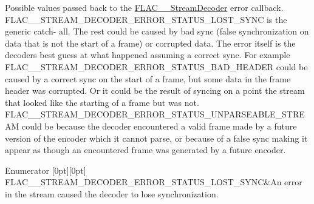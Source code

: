 Possible values passed back to the \hyperlink{struct_f_l_a_c_____stream_decoder}{F\+L\+A\+C\+\_\+\+\_\+\+Stream\+Decoder} error callback. {\ttfamily F\+L\+A\+C\+\_\+\+\_\+\+S\+T\+R\+E\+A\+M\+\_\+\+D\+E\+C\+O\+D\+E\+R\+\_\+\+E\+R\+R\+O\+R\+\_\+\+S\+T\+A\+T\+U\+S\+\_\+\+L\+O\+S\+T\+\_\+\+S\+Y\+NC} is the generic catch-\/ all. The rest could be caused by bad sync (false synchronization on data that is not the start of a frame) or corrupted data. The error itself is the decoder\textquotesingle{}s best guess at what happened assuming a correct sync. For example {\ttfamily F\+L\+A\+C\+\_\+\+\_\+\+S\+T\+R\+E\+A\+M\+\_\+\+D\+E\+C\+O\+D\+E\+R\+\_\+\+E\+R\+R\+O\+R\+\_\+\+S\+T\+A\+T\+U\+S\+\_\+\+B\+A\+D\+\_\+\+H\+E\+A\+D\+ER} could be caused by a correct sync on the start of a frame, but some data in the frame header was corrupted. Or it could be the result of syncing on a point the stream that looked like the starting of a frame but was not. {\ttfamily F\+L\+A\+C\+\_\+\+\_\+\+S\+T\+R\+E\+A\+M\+\_\+\+D\+E\+C\+O\+D\+E\+R\+\_\+\+E\+R\+R\+O\+R\+\_\+\+S\+T\+A\+T\+U\+S\+\_\+\+U\+N\+P\+A\+R\+S\+E\+A\+B\+L\+E\+\_\+\+S\+T\+R\+E\+AM} could be because the decoder encountered a valid frame made by a future version of the encoder which it cannot parse, or because of a false sync making it appear as though an encountered frame was generated by a future encoder. \begin{DoxyEnumFields}{Enumerator}
[0pt][0pt]{}\mbox{\label{group__flac__stream__decoder_gga130e70bd9a73d3c2416247a3e5132ecfa3ceec2a553dc142ad487ae88eb6f7222}} 
F\+L\+A\+C\+\_\+\+\_\+\+S\+T\+R\+E\+A\+M\+\_\+\+D\+E\+C\+O\+D\+E\+R\+\_\+\+E\+R\+R\+O\+R\+\_\+\+S\+T\+A\+T\+U\+S\+\_\+\+L\+O\+S\+T\+\_\+\+S\+Y\+NC&An error in the stream caused the decoder to lose synchronization. \\
\hline


\end{DoxyEnumFields}
